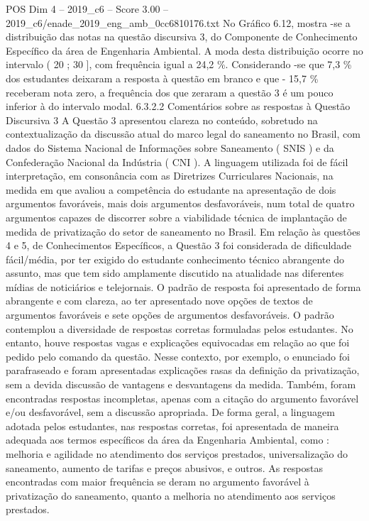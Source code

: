 \begin{textsample}{POS Dim 4 – 2019\_c6 – Score 3.00 – 2019\_c6/enade\_2019\_eng\_amb\_0cc6810176.txt}
No Gráfico 6.12, mostra -se a distribuição das notas na questão discursiva 3, do Componente de Conhecimento Específico da área de Engenharia Ambiental.
A moda desta distribuição ocorre no intervalo ( 20 ; 30 ], com frequência igual a 24,2 \%.
Considerando -se que 7,3 \% dos estudantes deixaram a resposta à questão em branco e que - 15,7 \% receberam nota zero, a frequência dos que zeraram a questão 3 é um pouco inferior à do intervalo modal. 6.3.2.2 Comentários sobre as respostas à Questão Discursiva 3 A Questão 3 apresentou clareza no conteúdo, sobretudo na contextualização da discussão atual do marco legal do saneamento no Brasil, com dados do Sistema Nacional de Informações sobre Saneamento ( SNIS ) e da Confederação Nacional da Indústria ( CNI ).
A linguagem utilizada foi de fácil interpretação, em consonância com as Diretrizes Curriculares Nacionais, na medida em que avaliou a competência do estudante na apresentação de dois argumentos favoráveis, mais dois argumentos desfavoráveis, num total de quatro argumentos capazes de discorrer sobre a viabilidade técnica de implantação de medida de privatização do setor de saneamento no Brasil.
Em relação às questões 4 e 5, de Conhecimentos Específicos, a Questão 3 foi considerada de dificuldade fácil/média, por ter exigido do estudante conhecimento técnico abrangente do assunto, mas que tem sido amplamente discutido na atualidade nas diferentes mídias de noticiários e telejornais.
O padrão de resposta foi apresentado de forma abrangente e com clareza, ao ter apresentado nove opções de textos de argumentos favoráveis e sete opções de argumentos desfavoráveis.
O padrão contemplou a diversidade de respostas corretas formuladas pelos estudantes.
No entanto, houve respostas vagas e explicações equivocadas em relação ao que foi pedido pelo comando da questão.
Nesse contexto, por exemplo, o enunciado foi parafraseado e foram apresentadas explicações rasas da definição da privatização, sem a devida discussão de vantagens e desvantagens da medida.
Também, foram encontradas respostas incompletas, apenas com a citação do argumento favorável e/ou desfavorável, sem a discussão apropriada.
De forma geral, a linguagem adotada pelos estudantes, nas respostas corretas, foi apresentada de maneira adequada aos termos específicos da área da Engenharia Ambiental, como : melhoria e agilidade no atendimento dos serviços prestados, universalização do saneamento, aumento de tarifas e preços abusivos, e outros.
As respostas encontradas com maior frequência se deram no argumento favorável à privatização do saneamento, quanto a melhoria no atendimento aos serviços prestados.

\end{textsample}
